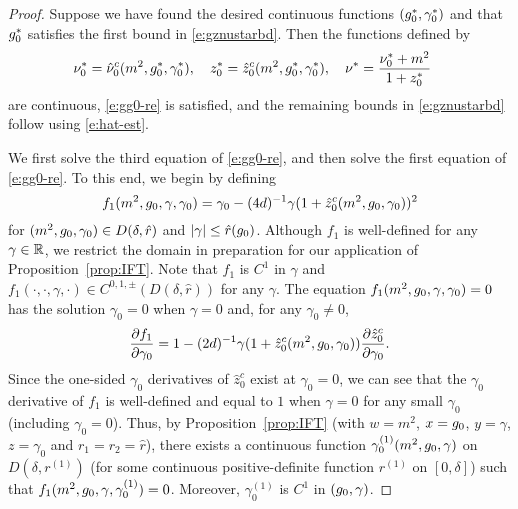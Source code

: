 \begin{proof}
Suppose we have found the desired continuous functions $(g_0^*, \gamma_0^*)$
and that $g_0^*$ satisfies the first bound in \eqref{e:gznustarbd}.
Then the functions defined by
\begin{align}
&\nu_0^* = \hat\nu_0^c(m^2, g_0^*, \gamma_0^*), \quad
z_0^* = \hat z_0^c(m^2, g_0^*, \gamma_0^*), \quad
\nu^* = \frac{\nu_0^* + m^2}{1 + z_0^*}
\end{align}
are continuous, \eqref{e:gg0-re} is satisfied, and
the remaining bounds in
\eqref{e:gznustarbd}
follow using \eqref{e:hat-est}.

We first solve the third equation of \eqref{e:gg0-re},
and then solve the first equation of \eqref{e:gg0-re}.
To this end, we begin by defining
\begin{equation}
f_1(m^2, g_0, \gamma, \gamma_0)
	=
\gamma_0 - (4d)^{-1} \gamma (1 + \hat z_0^c(m^2, g_0, \gamma_0))^2
\end{equation}
for $(m^2, g_0, \gamma_0) \in D(\delta, \hat r)$
and $|\gamma| \le \hat r(g_0)$.
Although $f_1$ is well-defined
for any $\gamma \in {\mathbb R}$, we restrict the domain in preparation
for our application of Proposition~\ref{prop:IFT}.
Note that $f_1$ is $C^1$ in $\gamma$ and
$f_1(\cdot, \cdot, \gamma, \cdot) \in C^{0,1,\pm}(D(\delta, \hat r))$ for any $\gamma$.
The equation $f_1(m^2, g_0, \gamma, \gamma_0) = 0$
has the solution $\gamma_0 = 0$ when $\gamma = 0$
and, for any $\gamma_0 \neq 0$,
\begin{equation}
\frac{\partial f_1}{\partial \gamma_0}
	=
1 - (2d)^{-1} \gamma (1 + \hat z_0^c(m^2, g_0, \gamma_0)) \frac{\partial \hat z_0^c}{\partial \gamma_0}.
\end{equation}
Since the one-sided $\gamma_0$ derivatives of $\hat z_0^c$ exist at $\gamma_0 = 0$,
we can see
that the $\gamma_0$ derivative of $f_1$ is well-defined
and equal to $1$ when $\gamma = 0$ for any small $\gamma_0$ (including $\gamma_0 = 0$).
Thus, by Proposition~\ref{prop:IFT}
(with $w = m^2$, $x = g_0$, $y = \gamma$, $z = \gamma_0$
and $r_1 = r_2 = \hat r$),
there exists a continuous function $\gamma^{(1)}_0(m^2, g_0, \gamma)$
on $D(\delta, r^{(1)})$ (for some continuous positive-definite function $r^{(1)}$ on $[0, \delta]$)
such that $f_1(m^2, g_0, \gamma, \gamma^{(1)}_0) = 0$.
Moreover, $\gamma^{(1)}_0$ is $C^1$ in $(g_0, \gamma)$.


\end{proof}
